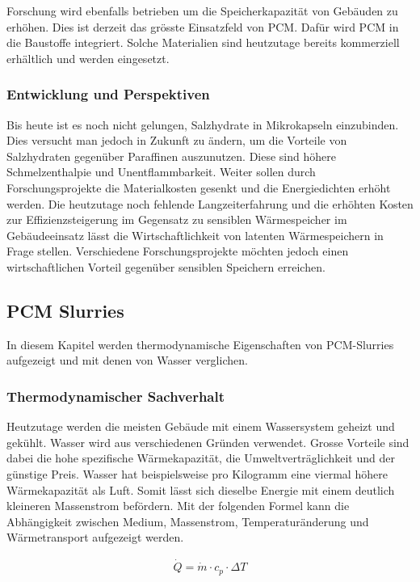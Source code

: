 \documentclass[11pt,a4paper]{scrartcl}
\begin{document}
Forschung wird ebenfalls betrieben um die Speicherkapazität von Gebäuden zu
erhöhen. Dies ist derzeit das grösste Einsatzfeld von PCM. Dafür wird  PCM in
die Baustoffe integriert. Solche Materialien sind heutzutage bereits kommerziell
erhältlich und werden eingesetzt.


\subsubsection{Entwicklung und Perspektiven}
Bis heute ist es noch nicht gelungen, Salzhydrate in Mikrokapseln einzubinden.
Dies versucht man jedoch in Zukunft zu ändern, um die Vorteile von Salzhydraten
gegenüber Paraffinen auszunutzen. Diese sind höhere Schmelzenthalpie und
Unentflammbarkeit. Weiter sollen durch Forschungsprojekte die Materialkosten
gesenkt und die Energiedichten erhöht werden. Die heutzutage noch fehlende
Langzeiterfahrung und die erhöhten Kosten zur Effizienzsteigerung im Gegensatz
zu sensiblen Wärmespeicher im Gebäudeeinsatz lässt die Wirtschaftlichkeit von
latenten Wärmespeichern in Frage stellen. Verschiedene Forschungsprojekte
möchten jedoch einen wirtschaftlichen Vorteil gegenüber sensiblen Speichern
erreichen.

\subsection{PCM Slurries}
In diesem Kapitel werden thermodynamische Eigenschaften von PCM-Slurries
aufgezeigt und mit denen von Wasser verglichen.
\subsubsection{Thermodynamischer Sachverhalt}
Heutzutage werden die meisten Gebäude mit einem Wassersystem geheizt und
gekühlt. Wasser wird aus verschiedenen Gründen verwendet. Grosse Vorteile sind
dabei die hohe spezifische Wärmekapazität, die Umweltverträglichkeit und der
günstige Preis. Wasser hat beispielsweise pro Kilogramm eine viermal höhere
Wärmekapazität als Luft. Somit lässt sich dieselbe Energie mit einem deutlich
kleineren Massenstrom befördern. Mit der folgenden Formel kann die Abhängigkeit
zwischen Medium, Massenstrom, Temperaturänderung und Wärmetransport aufgezeigt
werden.

\begin{align}
\dot{Q}=\dot{m} \cdot c_p \cdot \Delta T
\label{eq:PCM}
\end{align}
\end{document}
